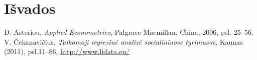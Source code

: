 \documentclass[a4paper]{article}
\begin{document}
\section{Išvados}



\newpage
\renewcommand{\refname}{\section{Literatūra}}
\begin{thebibliography}{3}
 D. Asteriou, \emph{Applied Econometrics}, Palgrave Macmillan, China, 2006, psl. 25--56.
 V. Čekanavičius, \emph{Taikomoji regresinė analizė socialiniuose tyrimuose}, Kaunas  (2011), psl.11--86, \url{http://www.lidata.eu/}
\end{thebibliography}
\end{document}
